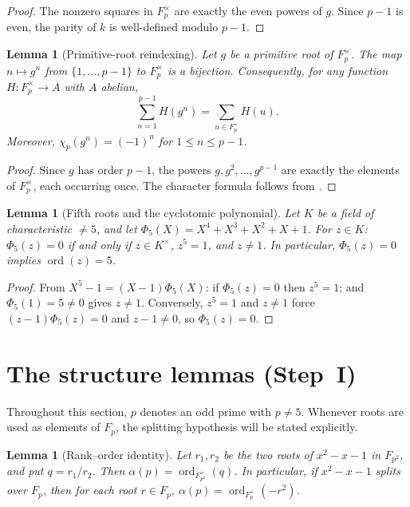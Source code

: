\documentclass[preprint,5p,times,twocolumn]{elsarticle}
\def\F{F}\def\Z{Z}\def\Q{Q}\def\R{R}\def\N{N}%
\newtheorem{lemma}[theorem]{Lemma}
\DeclareMathOperator{\ord}{ord}
\newcommand{\Z}{\mathbb{Z}}
\newcommand{\Q}{\mathbb{Q}}
\newcommand{\R}{\mathbb{R}}
\newcommand{\F}{\mathbb{F}}
\newcommand{\N}{\mathbb{N}}
\begin{document}
\begin{proof}
The nonzero squares in $\F_p^\times$ are exactly the even powers 
of $g$. Since $p-1$ is even, the parity of $k$ is well-defined 
modulo $p-1$.
\end{proof}

\begin{lemma}[Primitive-root reindexing]
\label{lem:primitive-reindexing}
Let $g$ be a primitive root of $\F_p^\times$. The map 
$n\mapsto g^n$ from $\{1,\dots,p-1\}$ to $\F_p^\times$ is a 
bijection. Consequently, for any function 
$H:\F_p^\times\to A$ with $A$ abelian,
\[
\sum_{n=1}^{p-1} H(g^n)=\sum_{u\in\F_p^\times} H(u).
\]
Moreover, $\chi_p(g^n)=(-1)^n$ for $1\le n\le p-1$.
\end{lemma}

\begin{proof}
Since $g$ has order $p-1$, the powers $g,g^2,\dots,g^{p-1}$ are 
exactly the elements of $\F_p^\times$, each occurring once. The 
character formula follows from .
\end{proof}

\begin{lemma}[Fifth roots and the cyclotomic polynomial]
\label{lem:phi5-order}
Let $K$ be a field of characteristic $\ne5$, and let 
$\Phi_5(X)=X^4+X^3+X^2+X+1$.
For $z\in K$: $\Phi_5(z)=0$ if and only if $z\in K^\times$, 
$z^5=1$, and $z\ne 1$. In particular, $\Phi_5(z)=0$ implies 
$\ord(z)=5$.
\end{lemma}

\begin{proof}
From $X^5-1=(X-1)\Phi_5(X)$: if $\Phi_5(z)=0$ then $z^5=1$; 
and $\Phi_5(1)=5\ne0$ gives $z\ne1$. Conversely, $z^5=1$ and 
$z\ne1$ force $(z-1)\Phi_5(z)=0$ and $z-1\ne0$, so $\Phi_5(z)=0$.
\end{proof}

\section{The structure lemmas (Step~I)}\label{sec:structure}

Throughout this section, $p$ denotes an odd prime with $p\ne5$. 
Whenever roots are used as elements of $\F_p$, the splitting 
hypothesis will be stated explicitly.

\begin{lemma}[Rank--order identity]\label{lem:rank-order}
Let $r_1,r_2$ be the two roots of $x^2-x-1$ in $\F_{p^2}$, and put
$q=r_1/r_2$. Then $\alpha(p)=\ord_{\F_{p^2}^\times}(q)$.
In particular, if $x^2-x-1$ splits over $\F_p$, then for each 
root $r\in\F_p$, $\alpha(p)=\ord_{\F_p^\times}(-r^2)$.
\end{lemma}
\end{document}
